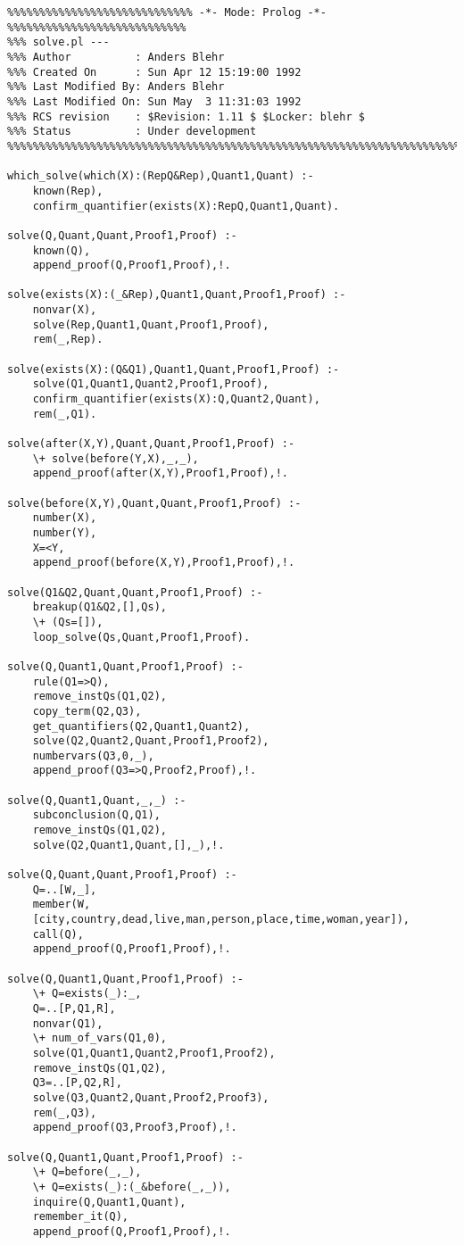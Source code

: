 \begin{verbatim}
%%%%%%%%%%%%%%%%%%%%%%%%%%%%% -*- Mode: Prolog -*- %%%%%%%%%%%%%%%%%%%%%%%%%%%%
%%% solve.pl --- 
%%% Author          : Anders Blehr
%%% Created On      : Sun Apr 12 15:19:00 1992
%%% Last Modified By: Anders Blehr
%%% Last Modified On: Sun May  3 11:31:03 1992
%%% RCS revision    : $Revision: 1.11 $ $Locker: blehr $
%%% Status          : Under development
%%%%%%%%%%%%%%%%%%%%%%%%%%%%%%%%%%%%%%%%%%%%%%%%%%%%%%%%%%%%%%%%%%%%%%%%%%%%%%

which_solve(which(X):(RepQ&Rep),Quant1,Quant) :-
	known(Rep),
	confirm_quantifier(exists(X):RepQ,Quant1,Quant).

solve(Q,Quant,Quant,Proof1,Proof) :- 
	known(Q),
	append_proof(Q,Proof1,Proof),!.

solve(exists(X):(_&Rep),Quant1,Quant,Proof1,Proof) :-
	nonvar(X),
	solve(Rep,Quant1,Quant,Proof1,Proof),
	rem(_,Rep).

solve(exists(X):(Q&Q1),Quant1,Quant,Proof1,Proof) :- 
	solve(Q1,Quant1,Quant2,Proof1,Proof),
	confirm_quantifier(exists(X):Q,Quant2,Quant),
	rem(_,Q1).

solve(after(X,Y),Quant,Quant,Proof1,Proof) :- 
	\+ solve(before(Y,X),_,_),
	append_proof(after(X,Y),Proof1,Proof),!.

solve(before(X,Y),Quant,Quant,Proof1,Proof) :-
	number(X),
	number(Y),
	X=<Y,
	append_proof(before(X,Y),Proof1,Proof),!.

solve(Q1&Q2,Quant,Quant,Proof1,Proof) :-
	breakup(Q1&Q2,[],Qs),
	\+ (Qs=[]),
	loop_solve(Qs,Quant,Proof1,Proof).

solve(Q,Quant1,Quant,Proof1,Proof) :-
	rule(Q1=>Q),
	remove_instQs(Q1,Q2),
	copy_term(Q2,Q3),
	get_quantifiers(Q2,Quant1,Quant2),
	solve(Q2,Quant2,Quant,Proof1,Proof2),
	numbervars(Q3,0,_),
	append_proof(Q3=>Q,Proof2,Proof),!.

solve(Q,Quant1,Quant,_,_) :-
	subconclusion(Q,Q1),
	remove_instQs(Q1,Q2),
	solve(Q2,Quant1,Quant,[],_),!.

solve(Q,Quant,Quant,Proof1,Proof) :-
	Q=..[W,_],
	member(W,
	[city,country,dead,live,man,person,place,time,woman,year]),
	call(Q),
	append_proof(Q,Proof1,Proof),!.

solve(Q,Quant1,Quant,Proof1,Proof) :-
	\+ Q=exists(_):_,
	Q=..[P,Q1,R],
	nonvar(Q1),
	\+ num_of_vars(Q1,0),
	solve(Q1,Quant1,Quant2,Proof1,Proof2),
	remove_instQs(Q1,Q2),
	Q3=..[P,Q2,R],
	solve(Q3,Quant2,Quant,Proof2,Proof3),
	rem(_,Q3),
	append_proof(Q3,Proof3,Proof),!.

solve(Q,Quant1,Quant,Proof1,Proof) :- 
	\+ Q=before(_,_),
	\+ Q=exists(_):(_&before(_,_)),
	inquire(Q,Quant1,Quant),
	remember_it(Q),
	append_proof(Q,Proof1,Proof),!.


\end{verbatim}
